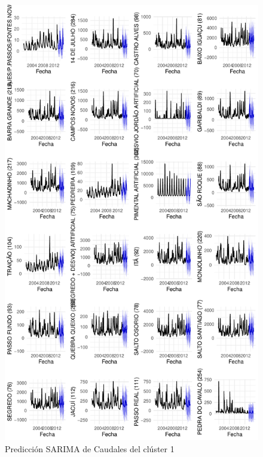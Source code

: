 \documentclass[12pt,oneside]{book}\usepackage[]{graphicx}\usepackage[]{color}
\makeatletter
\def\maxwidth{ %
  \ifdim\Gin@nat@width>\linewidth
    \linewidth
  \else
    \Gin@nat@width
  \fi
}
\newenvironment{knitrout}{}{} %
\theoremstyle{definition} %
\makeatother
\begin{document}
\begin{knitrout}
\color{fgcolor}\begin{figure}[h]

{\centering \includegraphics[width=\maxwidth,height=0.85\textheight]{figure/unnamed-chunk-77-1} 

}

\caption{\label{fig:pred_cl1} Predicción SARIMA de Caudales del clúster 1}\label{fig:unnamed-chunk-77}
\end{figure}


\end{knitrout}
\end{document}
